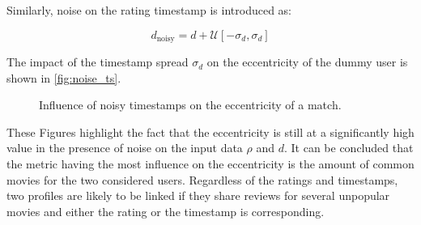 Similarly, noise on the rating timestamp is introduced as:

\begin{equation}
d_{\text{noisy}} = d + \mathcal{U}\left[-\sigma_{d}, \sigma_{d}\right]
\end{equation}

The impact of the timestamp spread $\sigma_{d}$ on the eccentricity of the dummy user is shown in \autoref{fig:noise_ts}.

\begin{figure}[h]
	\centering
	
	\caption{Influence of noisy timestamps on the eccentricity of a match.}
	\label{fig:noise_ts}
\end{figure}

These Figures highlight the fact that the eccentricity is still at a significantly high value in the presence of noise on the input data $\rho$ and $d$. It can be concluded that the metric having the most influence on the eccentricity is the amount of common movies for the two considered users. Regardless of the ratings and timestamps, two profiles are likely to be linked if they share reviews for several unpopular movies and either the rating or the timestamp is corresponding.